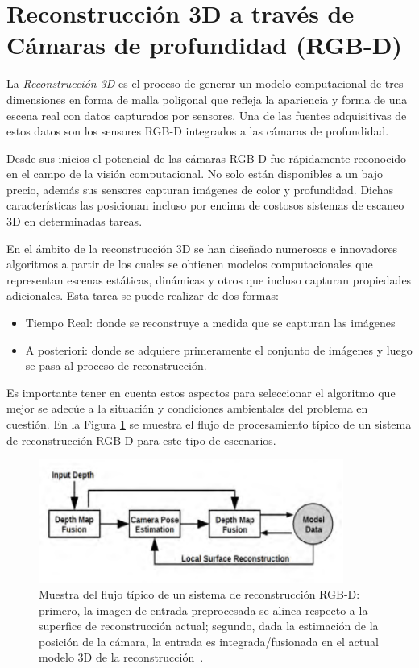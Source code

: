 \section{Reconstrucción 3D a través de Cámaras de profundidad  (RGB-D)}\label{section:rec3d}

La \textit{Reconstrucción 3D} es el proceso de generar un modelo computacional de tres dimensiones en forma de malla poligonal que refleja la apariencia y forma de una escena real con datos capturados por sensores. Una de las fuentes adquisitivas de estos datos son los sensores RGB-D integrados a las cámaras de profundidad.

Desde sus inicios el potencial de las cámaras RGB-D fue rápidamente reconocido en el campo de la visión computacional. No solo están disponibles a un bajo precio, además sus sensores capturan imágenes de color y profundidad. Dichas características las posicionan incluso por encima de costosos sistemas de escaneo 3D en determinadas tareas.

En el ámbito de la reconstrucción 3D se han diseñado numerosos e innovadores algoritmos a partir de los cuales se obtienen modelos computacionales que representan escenas estáticas, dinámicas y otros que incluso capturan propiedades adicionales. Esta tarea se puede realizar de dos formas:

\begin{itemize}
	\item Tiempo Real: donde se reconstruye  a medida que se capturan las imágenes
	\item A posteriori: donde se adquiere primeramente el conjunto de imágenes y luego se pasa al proceso de reconstrucción.
\end{itemize}

Es importante tener en cuenta estos aspectos para seleccionar el algoritmo que mejor se adecúe a la situación y condiciones ambientales del problema en cuestión. En la Figura \ref{fig:r3d} se muestra el flujo de procesamiento típico de un sistema de reconstrucción RGB-D para este tipo de escenarios.

\begin{figure}[h]
	\centering
	\includegraphics[width=10cm]{./Graphics/r3d.png}
	\caption{Muestra del flujo típico de un sistema de reconstrucción RGB-D: primero, la imagen de entrada preprocesada se alinea respecto a la superfice de reconstrucción actual; segundo, dada la estimación de la posición de la cámara, la entrada es integrada/fusionada en el actual modelo 3D de la reconstrucción~\cite{zollhofer2018state}.}
	\label{fig:r3d}
\end{figure}

